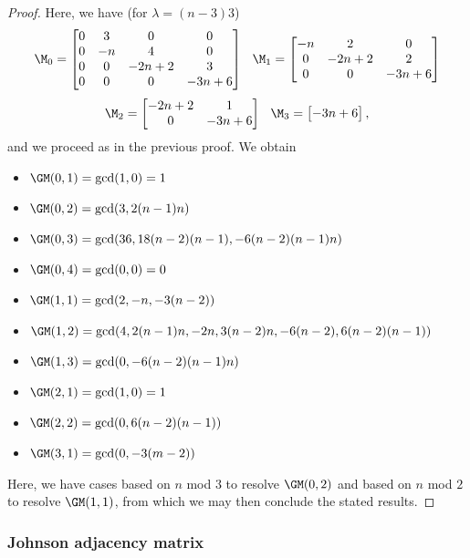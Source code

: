 \begin{proof}
Here, we have (for $\lambda = (n-3)3$)
\[ \M_0 = \begin{bmatrix} 0 & 3 & 0 & 0 \\ 0 & -n & 4 & 0 \\ 0 & 0 & -2n + 2 & 3 \\ 0 & 0 & 0 & -3n + 6 \end{bmatrix} 
    \hspace{0.1in}
\M_1 = \begin{bmatrix} -n & 2 & 0 \\ 0 & -2n + 2 & 2 \\ 0 & 0 & -3n + 6 \end{bmatrix} \]
\[ \M_2 = \begin{bmatrix} -2n + 2 & 1 \\ 0 & -3n + 6 \end{bmatrix} 
    \hspace{0.1in}
\M_3 = \begin{bmatrix} -3n + 6 \end{bmatrix}, \]
and we proceed as in the previous proof.  We obtain
\begin{itemize}
    \item $\GM(0, 1) = \gcd(1, 0) = 1$
    \item $\GM(0, 2) = \gcd(3, 2(n-1)n)$
    \item $\GM(0, 3) = \gcd(36, 18(n - 2) (n - 1), -6 (n - 2) (n - 1) n)$
    \item $\GM(0, 4) = \gcd(0, 0) = 0$

    \item $\GM(1, 1) = \gcd(2, -n, -3(n-2))$
    \item $\GM(1, 2) = \gcd(4, 2 (n - 1) n, -2 n, 3 (n - 2) n, -6 (n - 2), 6 (n - 2) (n - 1) )$
    \item $\GM(1, 3) = \gcd(0, -6(n-2)(n-1)n)$

    \item $\GM(2, 1) = \gcd(1, 0) = 1$
    \item $\GM(2, 2) = \gcd(0, 6(n-2)(n-1))$

    \item $\GM(3, 1) = \gcd(0, -3 (m - 2))$
\end{itemize}
Here, we have cases based on $n$ mod $3$ to resolve $\GM(0,2)$ and based on $n$ mod $2$ to resolve $\GM(1,1)$, from which we may then conclude the stated results.
\end{proof}


\subsubsection{Johnson adjacency matrix}

